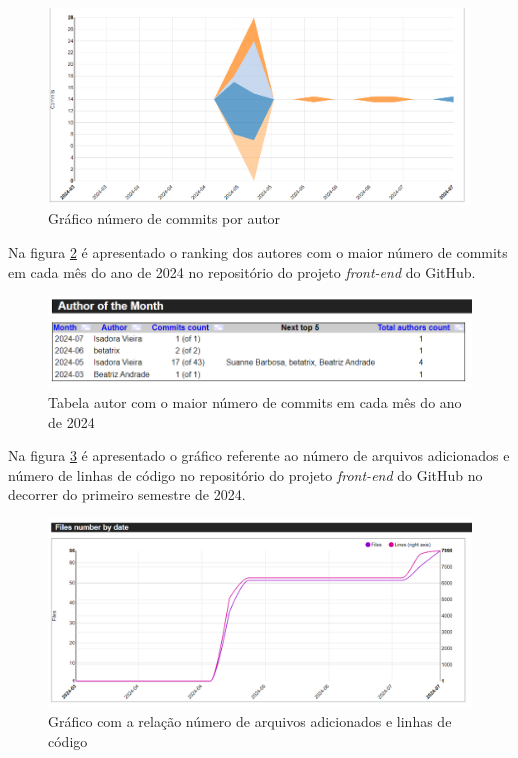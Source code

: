 \begin{figure}[ht]
        \centering
\includegraphics[width=1.0\textwidth]{images/commits-autor2-stats-front.png}
        \caption{Gráfico número de commits por autor}
        \label{fig:graficoCommitsPorAutorFront2}
    \end{figure}


Na figura \ref{fig:rankingAutoresFront} é apresentado o ranking dos autores com o maior número de commits em cada mês do ano de 2024 no repositório do projeto \textit{front-end} do GitHub.  

\begin{figure}[ht]
        \centering
\includegraphics[width=1.0\textwidth]{images/rank-autor-stats-front.png}
        \caption{Tabela autor com o maior número de commits em cada mês do ano de 2024}
        \label{fig:rankingAutoresFront}
    \end{figure}

\newpage

Na figura \ref{fig:numeroLinhasFront} é apresentado o gráfico referente ao número de arquivos adicionados e número de linhas de código no repositório do projeto \textit{front-end} do GitHub no decorrer do primeiro semestre de 2024.

\begin{figure}[ht]
        \centering
\includegraphics[width=1.0\textwidth]{images/arquivos-por-data-stats-front.png}
        \caption{Gráfico com a relação número de arquivos adicionados e linhas de código}
        \label{fig:numeroLinhasFront}
    \end{figure}

